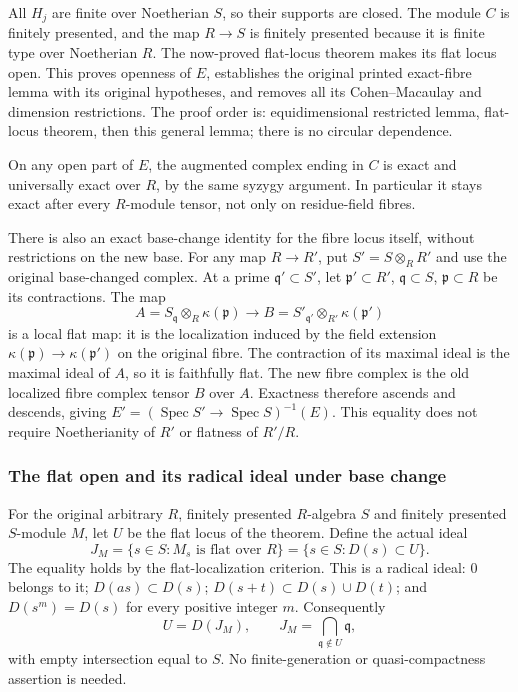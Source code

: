 All \(H_j\) are finite over Noetherian \(S\), so their supports are closed. The module \(C\) is finitely presented, and the map \(R\to S\) is finitely presented because it is finite type over Noetherian \(R\). The now-proved flat-locus theorem makes its flat locus open. This proves openness of \(E\), establishes the original printed exact-fibre lemma with its original hypotheses, and removes all its Cohen--Macaulay and dimension restrictions. The proof order is: equidimensional restricted lemma, flat-locus theorem, then this general lemma; there is no circular dependence.

On any open part of \(E\), the augmented complex ending in \(C\) is exact and universally exact over \(R\), by the same syzygy argument. In particular it stays exact after every \(R\)-module tensor, not only on residue-field fibres.

There is also an exact base-change identity for the fibre locus itself, without restrictions on the new base. For any map \(R\to R'\), put \(S'=S\otimes_R R'\) and use the original base-changed complex. At a prime \(\mathfrak q'\subset S'\), let \(\mathfrak p'\subset R'\), \(\mathfrak q\subset S\), \(\mathfrak p\subset R\) be its contractions. The map \[
A=S_{\mathfrak q}\otimes_R\kappa(\mathfrak p)
\longrightarrow
B=S'_{\mathfrak q'}\otimes_{R'}\kappa(\mathfrak p')
\] is a local flat map: it is the localization induced by the field extension \(\kappa(\mathfrak p)\to\kappa(\mathfrak p')\) on the original fibre. The contraction of its maximal ideal is the maximal ideal of \(A\), so it is faithfully flat. The new fibre complex is the old localized fibre complex tensor \(B\) over \(A\). Exactness therefore ascends and descends, giving \(E'=(\operatorname{Spec}S'\to\operatorname{Spec}S)^{-1}(E)\). This equality does not require Noetherianity of \(R'\) or flatness of \(R'/R\).

\subsubsection{The flat open and its radical ideal under base change}\label{algebra-proof-039-the-flat-open-and-its-radical-ideal-under-base-change}

For the original arbitrary \(R\), finitely presented \(R\)-algebra \(S\) and finitely presented \(S\)-module \(M\), let \(U\) be the flat locus of the theorem. Define the actual ideal \[
J_M=\{s\in S:M_s\text{ is flat over }R\}
    =\{s\in S:D(s)\subset U\}.
\] The equality holds by the flat-localization criterion. This is a radical ideal: \(0\) belongs to it; \(D(as)\subset D(s)\); \(D(s+t)\subset D(s)\cup D(t)\); and \(D(s^m)=D(s)\) for every positive integer \(m\). Consequently \[
U=D(J_M),\qquad
J_M=\bigcap_{\mathfrak q\notin U}\mathfrak q,
\] with empty intersection equal to \(S\). No finite-generation or quasi-compactness assertion is needed.

